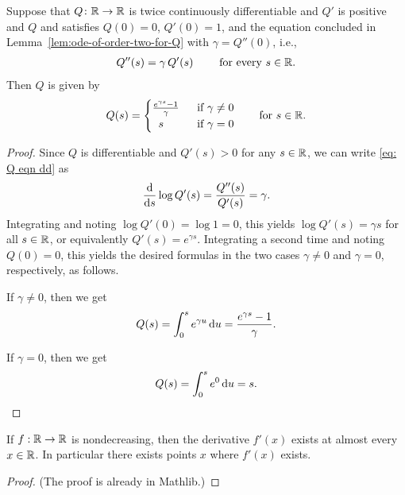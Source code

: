 \begin{lemma}
  \label{lem:solve-Q}
  Suppose that $Q \colon \mathbb{R} \to \mathbb{R}$ is twice continuously differentiable
  and $Q'$ is positive and $Q$
  and satisfies $Q(0)=0$, $Q'(0) = 1$, and the equation concluded in
  Lemma~\ref{lem:ode-of-order-two-for-Q} with $\gamma = Q''(0)$, i.e.,
  \begin{align}\label{eq: Q eqn dd}
  Q'' (s) = \gamma \, Q'(s) \qquad \text{ for every } s \in \mathbb{R} .
  \end{align}
  Then $Q$ is given by
  \begin{align*}
  Q(s) = \begin{cases}
    \frac{e^{\gamma s} - 1}{\gamma} & \; \text{ if $\gamma \ne 0$} \\
    \;\; s & \; \text{ if $\gamma = 0$}
    \end{cases}
    \qquad \text{for $s \in \mathbb{R}$.}
  \end{align*}
  \end{lemma}
\begin{proof}
  Since $Q$ is differentiable and $Q'(s)>0$ for any $s \in \mathbb{R}$,
  we can write \eqref{eq: Q eqn dd} as
  \begin{align*}
  \frac{\mathrm{d}}{\mathrm{d} s} \log Q'(s)
    = \frac{Q''(s)}{Q'(s)}
    = \gamma .
  \end{align*}
  Integrating and noting $\log Q'(0) = \log 1 = 0$, this
  yields $\log Q'(s) = \gamma s$ for all $s \in \mathbb{R}$, or equivalently
  $Q'(s) = e^{\gamma s}$. Integrating a second time
  and noting $Q(0) = 0$, this yields the desired formulas
  in the two cases $\gamma \ne 0$ and $\gamma = 0$, respectively, as follows.

  If $\gamma \ne 0$, then we get
  \begin{align*}
  Q(s) = \int_0^s e^{\gamma u} \, \mathrm{d} u = \frac{e^{\gamma s} - 1}{\gamma} .
  \end{align*}

  If $\gamma = 0$, then we get
  \begin{align*}
  Q(s) = \int_0^s e^0 \, \mathrm{d} u = s .
  \end{align*}
\end{proof}

\begin{theorem}
  \label{thm:monotone-ae-differentiable}
  \leanok
  \mathlibok
  If $f : \mathbb{R} \to \mathbb{R}$ is nondecreasing, then the derivative
  $f'(x)$ exists at almost every $x \in \mathbb{R}$.
  In particular there exists points $x$ where $f'(x)$ exists.
\end{theorem}
\begin{proof}
  \leanok
  (The proof is already in Mathlib.)
\end{proof}

